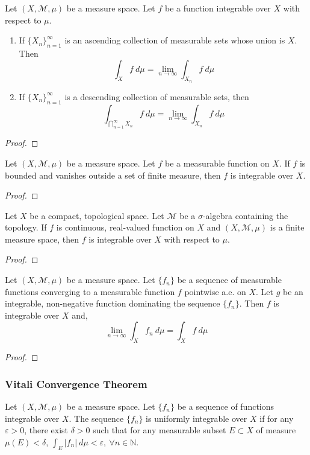 \begin{theorem}
	Let $(X,\mathcal{M},\mu)$ be a measure space.
	Let $f$ be a function integrable over $X$ with respect to $\mu$.
	\begin{enumerate}
		\item If $\{ X_n \}_{n=1}^\infty$ is an ascending collection of measurable sets whose union is $X$.
			Then
			\[ \int_X f \ d\mu = \lim_{n \to \infty} \int_{X_n} f \ d \mu \]
		\item If $\{ X_n \}_{n =1}^\infty$ is a descending collection of measurable sets, then
			\[ \int_{\bigcap_{n = 1}^\infty X_n} f \ d\mu = \lim_{n \to \infty} \int_{X_n} f \ d\mu \]
	\end{enumerate}
\end{theorem}
\begin{proof}
\end{proof}

\begin{theorem}
	Let $(X,\mathcal{M},\mu)$ be a measure space.
	Let $f$ be a measurable function on $X$.
	If $f$ is bounded and vanishes outside a set of finite measure, then $f$ is integrable over $X$.
\end{theorem}
\begin{proof}
\end{proof}

\begin{corollary}
	Let $X$ be a compact, topological space.
	Let $\mathcal{M}$ be a $\sigma$-algebra containing the topology.
	If $f$ is continuous, real-valued function on $X$ and $(X,\mathcal{M},\mu)$ is a finite measure space, then $f$ is integrable over $X$ with respect to $\mu$.
\end{corollary}
\begin{proof}
\end{proof}

\begin{theorem}
	Let $(X,\mathcal{M},\mu)$ be a measure space.
	Let $\{ f_n \}$ be a sequence of measurable functions converging to a measurable function $f$ pointwise a.e. on $X$.
	Let $g$ be an integrable, non-negative function dominating the sequence $\{ f_n \}$.
	Then $f$ is integrable over $X$ and,
	\[ \lim_{n \to \infty} \int_X f_n \ d\mu = \int_X f \ d\mu \]
\end{theorem}
\begin{proof}
\end{proof}

\subsubsection{Vitali Convergence Theorem}
\begin{definition}
	Let $(X,\mathcal{M},\mu)$ be a measure space.
	Let $\{ f_n \}$ be a sequence of functions integrable over $X$.
	The sequence $\{ f_n \}$ is uniformly integrable over $X$ if for any $\varepsilon > 0$, there exist $\delta > 0$ such that for any measurable subset $E \subset X$ of measure $\mu(E) < \delta$, $\displaystyle \int_E |f_n| \ d\mu < \varepsilon,\ \forall n \in \mathbb{N}$.
\end{definition}

